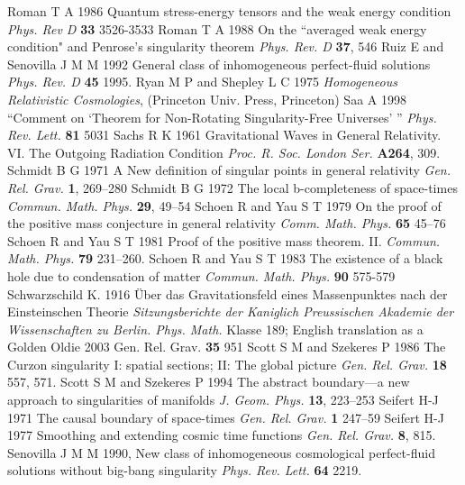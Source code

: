\documentclass[12pt]{iopart}
\begin{document}
\begin{thebibliography}{999}
 Roman T A 1986 Quantum stress-energy tensors and the weak energy condition {\it Phys. Rev D} {\bf 33} 3526-3533
 Roman T A 1988 On the ``averaged weak energy condition" and Penrose's singularity theorem {\it Phys. Rev. D} {\bf 37}, 546
 Ruiz E and Senovilla J M M 1992 General class of inhomogeneous perfect-fluid solutions {\it Phys. Rev. D} {\bf 45} 1995.
 Ryan M P and Shepley L C 1975 {\it Homogeneous
Relativistic Cosmologies}, (Princeton Univ. Press, Princeton)
 Saa A 1998 ``Comment on 
`Theorem for Non-Rotating Singularity-Free Universes' '' {\it 
Phys. Rev. Lett.} {\bf 81} 5031
 Sachs R K 1961 Gravitational Waves in General Relativity. VI. The Outgoing Radiation Condition {\it Proc. R. Soc. London Ser.} {\bf A264}, 309.
 Schmidt B G 1971 A New definition of singular points in general relativity {\it Gen. Rel. Grav.} {\bf 1}, 269--280%
 Schmidt B G 1972 The local b-completeness of space-times {\it Commun. Math. Phys.} {\bf 29},
49--54%
 Schoen R and Yau S T 1979 On the proof of the positive mass conjecture in general relativity {\it Comm. Math. Phys.} {\bf 65}  45--76
 Schoen R and Yau S T 1981 Proof of the positive mass theorem. II. 
{\it Commun. Math. Phys.} {\bf 79} 231--260. 
 Schoen R and Yau S T 1983 The existence of a black hole due to condensation of matter {\it Commun. Math. Phys.} {\bf 90} 575-579
 Schwarzschild K. 1916 \"Uber das Gravitationsfeld eines Massenpunktes nach der Einsteinschen Theorie {\it Sitzungsberichte der Kaniglich Preussischen Akademie der Wissenschaften
zu Berlin. Phys. Math.} Klasse 189; English translation as a Golden Oldie 2003
Gen. Rel. Grav. {\bf 35}  951 
 Scott S M and Szekeres P 1986 The Curzon singularity I: spatial sections; II: The global picture {\it Gen. Rel. Grav.} {\bf 18} 557, 571.%
 Scott S M and Szekeres P 1994 The abstract boundary---a new approach to singularities of manifolds {\it J. Geom. Phys.} {\bf 13},
223--253%
 Seifert H-J 1971 The causal boundary of space-times {\it Gen. Rel. Grav.} {\bf 1} 247--59
 Seifert H-J 1977 Smoothing and extending cosmic time functions {\it Gen. Rel. Grav.} {\bf 8}, 815.%
 Senovilla J M M 1990, New 
class of inhomogeneous cosmological perfect-fluid solutions without 
big-bang singularity {\it Phys. Rev. Lett.} {\bf 64} 2219.

\end{thebibliography}
\end{document}
